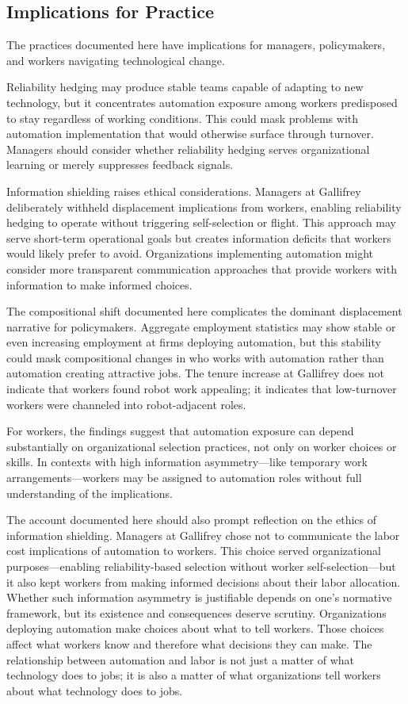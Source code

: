 \documentclass[12pt]{article}
\begin{document}
\subsection{Implications for Practice}

The practices documented here have implications for managers, policymakers, and workers navigating technological change.

Reliability hedging may produce stable teams capable of adapting to new technology, but it concentrates automation exposure among workers predisposed to stay regardless of working conditions. This could mask problems with automation implementation that would otherwise surface through turnover. Managers should consider whether reliability hedging serves organizational learning or merely suppresses feedback signals.

Information shielding raises ethical considerations. Managers at Gallifrey deliberately withheld displacement implications from workers, enabling reliability hedging to operate without triggering self-selection or flight. This approach may serve short-term operational goals but creates information deficits that workers would likely prefer to avoid. Organizations implementing automation might consider more transparent communication approaches that provide workers with information to make informed choices.

The compositional shift documented here complicates the dominant displacement narrative for policymakers. Aggregate employment statistics may show stable or even increasing employment at firms deploying automation, but this stability could mask compositional changes in who works with automation rather than automation creating attractive jobs. The tenure increase at Gallifrey does not indicate that workers found robot work appealing; it indicates that low-turnover workers were channeled into robot-adjacent roles.

For workers, the findings suggest that automation exposure can depend substantially on organizational selection practices, not only on worker choices or skills. In contexts with high information asymmetry---like temporary work arrangements---workers may be assigned to automation roles without full understanding of the implications.

The account documented here should also prompt reflection on the ethics of information shielding. Managers at Gallifrey chose not to communicate the labor cost implications of automation to workers. This choice served organizational purposes---enabling reliability-based selection without worker self-selection---but it also kept workers from making informed decisions about their labor allocation. Whether such information asymmetry is justifiable depends on one's normative framework, but its existence and consequences deserve scrutiny. Organizations deploying automation make choices about what to tell workers. Those choices affect what workers know and therefore what decisions they can make. The relationship between automation and labor is not just a matter of what technology does to jobs; it is also a matter of what organizations tell workers about what technology does to jobs.
\end{document}
